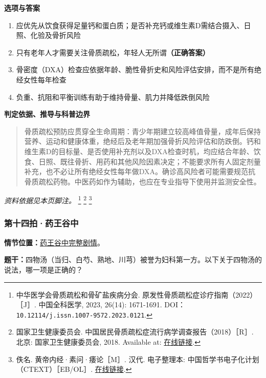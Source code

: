 \textbf{选项与答案}
\begin{enumerate}[label=\Alph*.,leftmargin=*]
  \item 应优先从饮食获得足量钙和蛋白质；是否补充钙或维生素D需结合摄入、日照、化验及骨折风险
  \item 只有老年人才需要关注骨质疏松，年轻人无所谓\textbf{（正确答案）}
  \item 骨密度（DXA）检查应依据年龄、脆性骨折史和风险评估安排，而不是所有绝经女性每年检查
  \item 负重、抗阻和平衡训练有助于维持骨量、肌力并降低跌倒风险
\end{enumerate}
\textbf{判定依据、推导与科普边界}
\begin{quote}骨质疏松预防应贯穿全生命周期：青少年期建立较高峰值骨量，成年后保持营养、运动和健康体重，绝经后及老年期加强骨折风险评估和防跌倒。钙和维生素D的目标量、是否使用补充剂以及DXA检查时机，均应结合年龄、饮食、日照、既往骨折、用药和其他风险因素决定；不能要求所有人固定剂量补充，也不必让所有绝经女性每年做DXA。确诊高风险者可能需要规范抗骨质疏松药物。中医药如作为辅助，也应在专业指导下使用并监测安全性。\end{quote}
\noindent\textit{资料依据见本页脚注。}
\footnote{中华医学会骨质疏松和骨矿盐疾病分会. 原发性骨质疏松症诊疗指南（2022）［J］. 中国全科医学, 2023, 26(14): 1671-1691. DOI：\nolinkurl{10.12114/j.issn.1007-9572.2023.0121}.}
\footnote{国家卫生健康委员会. 中国居民骨质疏松症流行病学调查报告（2018）［R］. 北京: 国家卫生健康委员会, 2018. Available at: \href{https://www.nhc.gov.cn/ewebeditor/uploadfile/2018/10/20181020192813503.pdf}{在线链接}.}
\footnote{佚名. 黄帝内经·素问·痿论［M］. 汉代. 电子整理本: 中国哲学书电子化计划（CTEXT）［EB/OL］. \href{https://ctext.org/huangdi-neijing/wei-lun/zh}{在线链接}.}

\subsubsection{第十四拍·药王谷中}\label{question:zhouzhiruo:14}
\textbf{情节位置：}\hyperref[plot:zhouzhiruo:14]{药王谷中完整剧情}。

\textbf{题干：}四物汤（当归、白芍、熟地、川芎）被誉为妇科第一方。以下关于四物汤的说法，哪一项是正确的？

